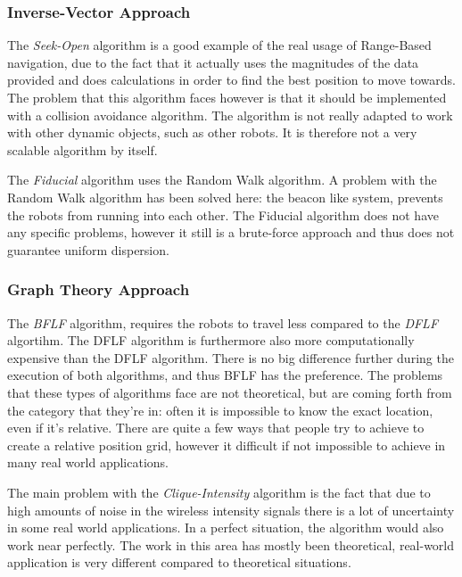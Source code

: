 \subsubsection{Inverse-Vector Approach}
The \emph{Seek-Open} algorithm is a good example of the real usage of Range-Based navigation, due to the fact that it actually uses the magnitudes of the data provided and does calculations in order to find the best position to move towards. The problem that this algorithm faces however is that it should be implemented with a collision avoidance algorithm. The algorithm is not really adapted to work with other dynamic objects, such as other robots. It is therefore not a very scalable algorithm by itself.

The \emph{Fiducial} algorithm uses the Random Walk algorithm. A problem with the Random Walk algorithm has been solved here: the beacon like system, prevents the robots from running into each other. The Fiducial algorithm does not have any specific problems, however it still is a brute-force approach and thus does not guarantee uniform dispersion.

\subsubsection{Graph Theory Approach}
The \emph{BFLF} algorithm, requires the robots to travel less compared to the \emph{DFLF} algortihm. The DFLF algorithm is furthermore also more computationally expensive than the DFLF algorithm. There is no big difference further during the execution of both algorithms, and thus BFLF has the preference. The problems that these types of algorithms face are not theoretical, but are coming forth from the category that they're in: often it is impossible to know the exact location, even if it's relative. There are quite a few ways that people try to achieve to create a relative position grid, however it difficult if not impossible to achieve in many real world applications.

The main problem with the \emph{Clique-Intensity} algorithm is the fact that due to high amounts of noise in the wireless intensity signals there is a lot of uncertainty in some real world applications. In a perfect situation, the algorithm would also work near perfectly. The work in this area has mostly been theoretical, real-world application is very different compared to theoretical situations.\\

